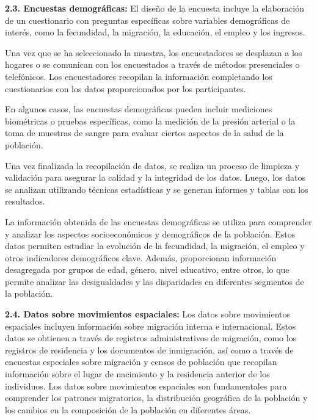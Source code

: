 \documentclass[8pt,a4paper]{beamer}
\begin{document}
{\begin{frame}{}
\begin{block}{\textbf{2.3. Encuestas demográficas:}}
El diseño de la encuesta incluye la elaboración de un cuestionario con preguntas específicas sobre variables demográficas de interés, como la fecundidad, la migración, la educación, el empleo y los ingresos.

Una vez que se ha seleccionado la muestra, los encuestadores se desplazan a los hogares o se comunican con los encuestados a través de métodos presenciales o telefónicos. Los encuestadores recopilan la información completando los cuestionarios con los datos proporcionados por los participantes.

En algunos casos, las encuestas demográficas pueden incluir mediciones biométricas o pruebas específicas, como la medición de la presión arterial o la toma de muestras de sangre para evaluar ciertos aspectos de la salud de la población.
\end{block}
\end{frame}

\begin{frame}{}
\begin{block}{}
\justifying
Una vez finalizada la recopilación de datos, se realiza un proceso de limpieza y validación para asegurar la calidad y la integridad de los datos. Luego, los datos se analizan utilizando técnicas estadísticas y se generan informes y tablas con los resultados.

La información obtenida de las encuestas demográficas se utiliza para comprender y analizar los aspectos socioeconómicos y demográficos de la población. Estos datos permiten estudiar la evolución de la fecundidad, la migración, el empleo y otros indicadores demográficos clave. Además, proporcionan información desagregada por grupos de edad, género, nivel educativo, entre otros, lo que permite analizar las desigualdades y las disparidades en diferentes segmentos de la población.
\end{block}
\begin{block}{\textbf{2.4. Datos sobre movimientos espaciales:}}
\justifying
Los datos sobre movimientos espaciales incluyen información sobre migración interna e internacional. Estos datos se obtienen a través de registros administrativos de migración, como los registros de residencia y los documentos de inmigración, así como a través de encuestas especiales sobre migración y censos de población que recopilan información sobre el lugar de nacimiento y la residencia anterior de los individuos. Los datos sobre movimientos espaciales son fundamentales para comprender los patrones migratorios, la distribución geográfica de la población y los cambios en la composición de la población en diferentes áreas.
\end{block}
\end{frame}

}
\end{document}
